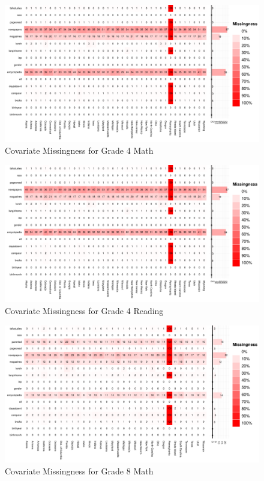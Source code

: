 \documentclass[letterpaper,12p,twoside]{article} %
\begin{document}
\begin{figure}[h]
\begin{center}
\includegraphics[width=\textwidth]{../Figures/g4mathmissing.pdf}
\caption{Covariate Missingness for Grade 4 Math}
\label{fig:g4math:missing}
\end{center}
\end{figure}

\begin{figure}[h]
\begin{center}
\includegraphics[width=\textwidth]{../Figures/g4readingmissing.pdf}
\caption{Covariate Missingness for Grade 4 Reading}
\label{fig:g4reading:missing}
\end{center}
\end{figure}

\begin{figure}[h]
\begin{center}
\includegraphics[width=\textwidth]{../Figures/g8mathmissing.pdf}
\caption{Covariate Missingness for Grade 8 Math}
\label{fig:g8math:missing}
\end{center}
\end{figure}
\end{document}
